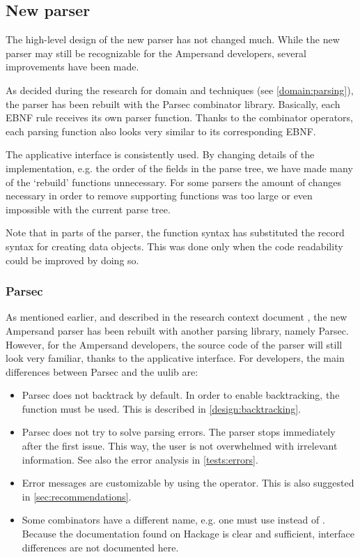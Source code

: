 
\subsection{New parser}
\label{design:new-parser}
The high-level design of the new parser has not changed much.
While the new parser may still be recognizable for the Ampersand developers, several improvements have been made.

As decided during the research for domain and techniques (see \autoref{domain:parsing}), the parser has been rebuilt with the Parsec combinator library.
Basically, each EBNF rule receives its own parser function.
Thanks to the combinator operators, each parsing function also looks very similar to its corresponding EBNF.

The applicative interface is consistently used.
By changing details of the implementation, e.g. the order of the fields in the parse tree, we have made many of the `rebuild' functions unnecessary.
For some parsers the amount of changes necessary in order to remove supporting functions was too large or even impossible with the current parse tree.

Note that in parts of the parser, the function syntax has substituted the record syntax for creating data objects.
This was done only when the code readability could be improved by doing so.

\subsubsection{Parsec}
\label{design:parsing-lib}
As mentioned earlier, and described in the research context document , the new Ampersand parser has been rebuilt with another parsing library, namely Parsec.
However, for the Ampersand developers, the source code of the parser will still look very familiar, thanks to the applicative interface.
For developers, the main differences between Parsec and the uulib are:
\begin{itemize}
  \item Parsec does not backtrack by default.
    In order to enable backtracking, the  function must be used.
    This is described in \autoref{design:backtracking}.
  \item Parsec does not try to solve parsing errors.
    The parser stops immediately after the first issue.
   This way, the user is not overwhelmed with irrelevant information.
    See also the error analysis in \autoref{tests:errors}.
  \item Error messages are customizable by using the  operator.
    This is also suggested in \autoref{sec:recommendations}.
  \item Some combinators have a different name, e.g. one must use  instead of .
    Because the documentation found on Hackage is clear and sufficient, interface differences are not documented here.
\end{itemize}

